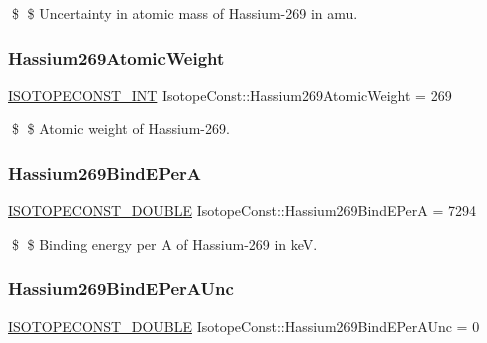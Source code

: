 \$ \$ Uncertainty in atomic mass of Hassium-\/269 in amu. \mbox{\label{group___isotope_const-_hassium-_hs269_gace697fbf132c063e1e079745d4ed418c}} 
\subsubsection{\texorpdfstring{Hassium269\+Atomic\+Weight}{Hassium269AtomicWeight}}
{\footnotesize\ttfamily \mbox{\hyperlink{group___isotope_const-_macros_ga5f18360b3e99483a35c32d789e62621c}{I\+S\+O\+T\+O\+P\+E\+C\+O\+N\+S\+T\+\_\+\+I\+NT}} Isotope\+Const\+::\+Hassium269\+Atomic\+Weight = 269}

\$ \$ Atomic weight of Hassium-\/269. \mbox{\label{group___isotope_const-_hassium-_hs269_gabb440834d030a7a68fc2197a9f86c353}} 
\subsubsection{\texorpdfstring{Hassium269\+Bind\+E\+PerA}{Hassium269BindEPerA}}
{\footnotesize\ttfamily \mbox{\hyperlink{group___isotope_const-_macros_ga8f45a7272ce02c0b4c65c44636ed719a}{I\+S\+O\+T\+O\+P\+E\+C\+O\+N\+S\+T\+\_\+\+D\+O\+U\+B\+LE}} Isotope\+Const\+::\+Hassium269\+Bind\+E\+PerA = 7294}

\$ \$ Binding energy per A of Hassium-\/269 in keV. \mbox{\label{group___isotope_const-_hassium-_hs269_ga3b797a4c35166fdf270f8ff15d3e8c74}} 
\subsubsection{\texorpdfstring{Hassium269\+Bind\+E\+Per\+A\+Unc}{Hassium269BindEPerAUnc}}
{\footnotesize\ttfamily \mbox{\hyperlink{group___isotope_const-_macros_ga8f45a7272ce02c0b4c65c44636ed719a}{I\+S\+O\+T\+O\+P\+E\+C\+O\+N\+S\+T\+\_\+\+D\+O\+U\+B\+LE}} Isotope\+Const\+::\+Hassium269\+Bind\+E\+Per\+A\+Unc = 0}

